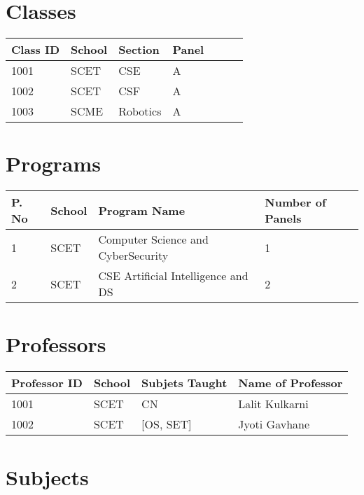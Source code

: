 \documentclass[11pt]{article}
\begin{document}
\section{Classes}

\begin{table}[H]
    \begin{tabular}{|l|l|l|l|l|l|l|}
    \hline
    Class ID & School & Section  & Panel \\ \hline
    1001     & SCET   & CSE      & A     \\ \hline
    1002     & SCET   & CSF      & A     \\ \hline
    1003     & SCME   & Robotics & A     \\ \hline
    \end{tabular}
    \end{table}

\section{Programs}

\begin{table}[H]
    \begin{tabular}{|l|l|l|l|}
    \hline
    P. No & School & Program Name                       & Number of  Panels \\ \hline
    1     & SCET   & Computer Science and CyberSecurity & 1                 \\ \hline
    2     & SCET   & CSE Artificial Intelligence and DS & 2                 \\ \hline
    \end{tabular}
\end{table}

\section{Professors}
\begin{table}[H]
    \begin{tabular}{|l|l|l|l|}
    \hline
    Professor ID & School & Subjets Taught & Name of Professor \\ \hline
    1001         & SCET   & CN             & Lalit Kulkarni    \\ \hline
    1002         & SCET   & {[}OS, SET{]}  & Jyoti Gavhane     \\ \hline
    \end{tabular}
    \end{table}
\section{Subjects}
\end{document}
